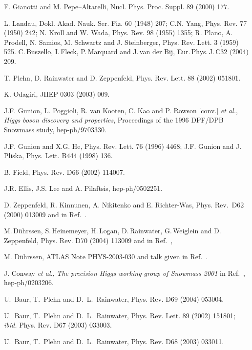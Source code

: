 \begin{thebibliography}{999}
 F. Gianotti and M. Pepe--Altarelli, Nucl. Phys. Proc. 
Suppl. 89 (2000) 177. 

L. Landau, Dokl. Akad. Nauk. Ser. Fiz. 60 (1948) 207; 
C.N. Yang, Phys. Rev. 77 (1950) 242; 
N. Kroll and W. Wada, Phys. Rev. 98 (1955) 1355; R. Plano, A. Prodell, N. 
Samios, M. Schwartz and J. Steinberger, Phys. Rev. Lett. 3 (1959) 525. 
%
 C.\,Buszello, I.\,Fleck, P.\,Marquard and J.\,van der Bij,
Eur.\,Phys.\,J.\,C32 (2004) 209. 

T. Plehn, D. Rainwater and D. Zeppenfeld, Phys. Rev. Lett. 88 (2002) 051801.

 K. Odagiri,  JHEP 0303 (2003) 009.

 J.F. Gunion, L. Poggioli, R. van Kooten, C. Kao and 
P. Rowson [conv.] {\it et al.}, {\it Higgs boson discovery and properties},
 Proceedings of the 1996 DPF/DPB Snowmass study, hep-ph/9703330. 

J.F. Gunion and X.G. He, Phys. Rev. Lett. 76 (1996) 4468;
J.F. Gunion and J. Pliska, Phys. Lett. B444 (1998) 136. 

B. Field, Phys. Rev. D66 (2002) 114007. 

  J.R. Ellis, J.S. Lee and A. Pilaftsis, hep-ph/0502251. 

 D. Zeppenfeld, R. Kinnunen, A. Nikitenko and E. 
Richter-Was, Phys. Rev.~D62 (2000) 013009 and in Ref.~\cite{Houches1999}.

 M.\,D\"uhrssen, S.\,Heinemeyer, H.\,Logan, D.\,Rainwater,
G.\,Weiglein and D.\,Zeppenfeld, Phys. Rev. D70 (2004) 113009 and   
in Ref.~\cite{Houches2003},

 M. D\"uhrssen, ATLAS Note PHYS-2003-030 and talk given 
in Ref.~\cite{Vienna}. 

J. Conway {\it et al.}, {\it The precision Higgs working
group of Snowmass 2001} in Ref.~\cite{Snowmass2001}, hep-ph/0203206. 

U.~Baur, T.~Plehn and D.~L.~Rainwater, Phys. Rev. D69 (2004) 053004.

 U.~Baur, T.~Plehn and D.~L.~Rainwater, Phys. Rev. Lett. 89 
(2002) 151801; {\it ibid.} Phys. Rev. D67 (2003) 033003.  

 U.~Baur, T.~Plehn and D.~L.~Rainwater, Phys. Rev. D68 (2003) 
033011. 


\end{thebibliography}

